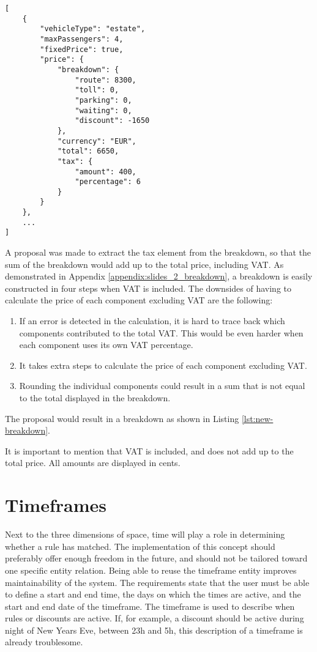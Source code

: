 \noindent\begin{minipage}{.45\textwidth}
\begin{lstlisting}[caption={Array of products with pricing}, label={lst:new-breakdown}]
[
	{
		"vehicleType": "estate",
		"maxPassengers": 4,
		"fixedPrice": true,
		"price": {
			"breakdown": {
				"route": 8300,
				"toll": 0,
				"parking": 0,
				"waiting": 0,
				"discount": -1650
			},
			"currency": "EUR",
			"total": 6650,
			"tax": {
				"amount": 400,
				"percentage": 6
			}
		}
	},
	...
]
\end{lstlisting}
\end{minipage}

A proposal was made to extract the tax element from the breakdown, so that the sum of the breakdown would add up to the total price, including VAT. As demonstrated in Appendix \ref{appendix:slides_2_breakdown}, a breakdown is easily constructed in four steps when VAT is included. The downsides of having to calculate the price of each component excluding VAT are the following:

\begin{enumerate}
	\item If an error is detected in the calculation, it is hard to trace back which components contributed to the total VAT. This would be even harder when each component uses its own VAT percentage.
	\item It takes extra steps to calculate the price of each component excluding VAT.
	\item Rounding the individual components could result in a sum that is not equal to the total displayed in the breakdown.
\end{enumerate}

The proposal would result in a breakdown as shown in Listing \ref{lst:new-breakdown}.

It is important to mention that VAT is included, and does not add up to the total price. All amounts are displayed in cents.

%
\section{Timeframes}
Next to the three dimensions of space, time will play a role in determining whether a rule has matched. The implementation of this concept should preferably offer enough freedom in the future, and should not be tailored toward one specific entity relation. Being able to reuse the timeframe entity improves maintainability of the system. The requirements state that the user must be able to define a start and end time, the days on which the times are active, and the start and end date of the timeframe. The timeframe is used to describe when rules or discounts are active. If, for example, a discount should be active during night of New Years Eve, between 23h and 5h, this description of a timeframe is already troublesome.

